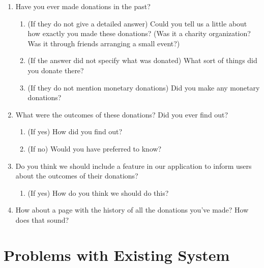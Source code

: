 \documentclass[11pt]{article}
\begin{document}
    \begin{enumerate}
        \item Have you ever made donations in the past?
        
        \begin{enumerate}[label=(\alph*)]
            \item (If they do not give a detailed answer) Could you tell us a little about how exactly you made these donations? (Was it a charity organization? Was it through friends arranging a small event?)
            \item (If the answer did not specify what was donated) What sort of things did you donate there?
            \item (If they do not mention monetary donations) Did you make any monetary donations?
        \end{enumerate}
        
        \item What were the outcomes of these donations? Did you ever find out?
        
        \begin{enumerate}[label=(\alph*)]
            \item (If yes) How did you find out?
            \item (If no) Would you have preferred to know?
        \end{enumerate}
        
        \item Do you think we should include a feature in our application to inform users about the outcomes of their donations?
        
        \begin{enumerate}[label=(\alph*)]
            \item (If yes) How do you think we should do this?
        \end{enumerate}
        
        \item How about a page with the history of all the donations you’ve made? How does that sound?
    \end{enumerate}
    
    \section {Problems with Existing System}
    
\end{document}
